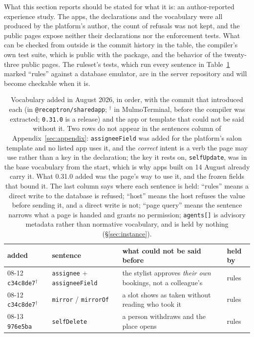 \documentclass[11pt]{article}
\begin{document}
What this section reports should be stated for what it is: an author-reported experience study. The apps, the declarations and the vocabulary were all produced by the platform's author, the count of refusals was not kept, and the public pages expose neither their declarations nor the enforcement tests. What can be checked from outside is the commit history in the table, the compiler's own test suite, which is public with the package, and the behavior of the twenty-three public pages. The ruleset's tests, which run every sentence in Table~\ref{tab:growth} marked ``rules'' against a database emulator, are in the server repository and will become checkable when it is.

\begin{table}[tb]
\caption{Vocabulary added in August 2026, in order, with the commit that introduced each (in \texttt{@receptron/sharedapp}; $^{\dagger}$ in MulmoTerminal, before the compiler was extracted; \texttt{0.31.0} is a release) and the app or template that could not be said without it. Two rows do not appear in the sentences column of Appendix~\ref{sec:appendix}: \texttt{assigneeField} was added for the platform's salon template and no listed app uses it, and the \emph{correct} intent is a verb the page may use rather than a key in the declaration; the key it rests on, \texttt{selfUpdate}, was in the base vocabulary from the start, which is why apps built on 14 August already carry it. What 0.31.0 added was the page's way to use it, and the frozen fields that bound it. The last column says where each sentence is held: ``rules'' means a direct write to the database is refused; ``host'' means the host refuses the value before sending it, and a direct write is not; ``page query'' means the sentence narrows what a page is handed and grants no permission; \texttt{agents[]} is advisory metadata rather than normative vocabulary, and is held by nothing (\S\ref{sec:instance}).}
\label{tab:growth}
\footnotesize
\begin{tabular}{@{}llp{6.4cm}l@{}}
\toprule
added & sentence & what could not be said before & held by \\
\midrule
08-12 \texttt{c34c8de7}$^{\dagger}$ & \texttt{assignee} + \texttt{assigneeField} & the stylist approves \emph{their own} bookings, not a colleague's & rules \\
08-12 \texttt{c34c8de7}$^{\dagger}$ & \texttt{mirror} / \texttt{mirrorOf} & a slot shows as taken without reading who took it & rules \\
08-13 \texttt{976e5ba} & \texttt{selfDelete} & a person withdraws and the place opens & rules \\

\end{tabular}
\end{table}
\end{document}
